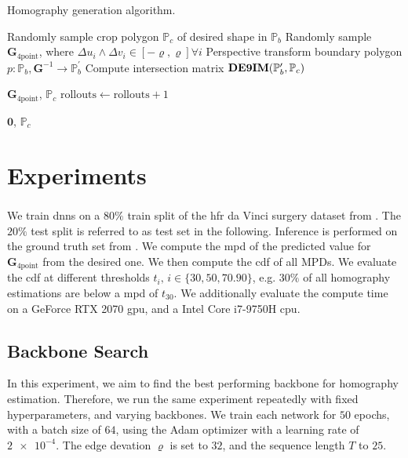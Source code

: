 \begin{algorithm}
    \caption{Homography generation algorithm.}
    \label{c3:alg:hom}
    \begin{algorithmic}
        \State Randomly sample crop polygon $\mathbb{P}_c$ of desired shape in $\mathbb{P}_b$\;
        \State Randomly sample $\mathbf{G}_{4\text{point}}$, where $\Delta u_i \land \Delta v_i \in \left[-\varrho, \varrho\right] \forall i$\;
        \State Perspective transform boundary polygon $p: \mathbb{P}_b, \mathbf{G}^{-1}\rightarrow\mathbb{P}^\prime_b$\;
        \State Compute intersection matrix $\operatorname{\mathbf{DE9IM}}(\mathbb{P}^\prime_b, \mathbb{P}_c)$\;
            
            \Return $\mathbf{G}_{4\text{point}}$, $\mathbb{P}_c$
        \EndIf
        \State $\text{rollouts} \gets \text{rollouts} + 1$
        \EndWhile
        
        \Return $\mathbf{0}$, $\mathbb{P}_c$
    \end{algorithmic}
\end{algorithm}

\section{Experiments}
We train \gls{dnn}s on a $80\%$ train split of the \gls{hfr} da Vinci\textsuperscript{\textregistered} surgery dataset from . The $20\%$ test split is referred to as test set in the following. Inference is performed on the ground truth set from . We compute the \gls{mpd} of the predicted value for $\mathbf{G}_{4\text{point}}$ from the desired one. We then compute the \gls{cdf} of all MPDs. We evaluate the \gls{cdf} at different thresholds $t_i,\,i\in\{30,50,70.90\}$, e.g. $30\%$ of all homography estimations are below a \gls{mpd} of $t_{30}$. We additionally evaluate the compute time on a GeForce RTX 2070 \gls{gpu}, and a Intel Core i7-9750H \gls{cpu}.

\subsection{Backbone Search}
In this experiment, we aim to find the best performing backbone for homography estimation. Therefore, we run the same experiment repeatedly with fixed hyperparameters, and varying backbones. We train each network for $50$ epochs, with a batch size of $64$, using the Adam optimizer with a learning rate of $\num{2e-4}$. The edge devation $\varrho$ is set to $32$, and the sequence length $T$ to $25$.

